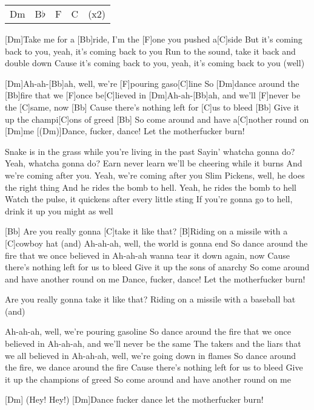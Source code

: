 

\begin{guitar}
	{\footnotesize\begin{tabular}{l|l|l|l l}
			Dm & B$\flat$ & F & C & (x2)
	\end{tabular}}
	
	[Dm]Take me for a [Bb]ride, I'm the [F]one you pushed a[C]side
	But it's coming back to you, yeah, it's coming back to you
	Run to the sound, take it back and double down
	Cause it's coming back to you, yeah, it's coming back to you (well)
	
	[Dm]Ah-ah-[Bb]ah, well, we're [F]pouring gaso[C]line
	So [Dm]dance around the [Bb]fire that we [F]once be[C]lieved in
	[Dm]Ah-ah-[Bb]ah, and we'll [F]never be the [C]same, now
	[Bb] Cause there's nothing left for [C]us to bleed
	[Bb] Give it up the champi[C]ons of greed
	[Bb] So come around and have a[C]nother round on [Dm]me
	[(Dm)]Dance, fucker, dance! Let the motherfucker burn!
	
	Snake is in the grass while you're living in the past
	Sayin' whatcha gonna do? Yeah, whatcha gonna do?
	Earn never learn we'll be cheering while it burns
	And we're coming after you. Yeah, we're coming after you
	Slim Pickens, well, he does the right thing
	And he rides the bomb to hell. Yeah, he rides the bomb to hell
	Watch the pulse, it quickens after every little sting
	If you're gonna go to hell, drink it up you might as well
	
	[Bb] Are you really gonna [C]take it like that?
	[B]Riding on a missile with a [C]cowboy hat (and)
	\pagebreak
	Ah-ah-ah, well, the world is gonna end
	So dance around the fire that we once believed in
	Ah-ah-ah wanna tear it down again, now
	Cause there's nothing left for us to bleed
	Give it up the sons of anarchy
	So come around and have another round on me
	Dance, fucker, dance! Let the motherfucker burn!
	
	
	Are you really gonna take it like that?
	Riding on a missile with a baseball bat (and)
	
	Ah-ah-ah, well, we're pouring gasoline
	So dance around the fire that we once believed in
	Ah-ah-ah, and we'll never be the same
	The takers and the liars that we all believed in
	Ah-ah-ah, well, we're going down in flames
	So dance around the fire, we dance around the fire
	Cause there's nothing left for us to bleed
	Give it up the champions of greed
	So come around and have another round on me
	
	[Dm] (Hey! Hey!)
	[Dm]Dance fucker dance let the motherfucker burn!
\end{guitar}